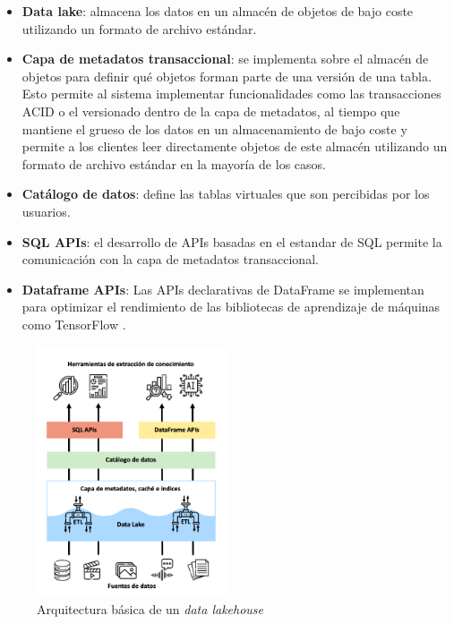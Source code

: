 \begin{itemize}
    \item \textbf{Data lake}: almacena los datos en un almacén de objetos de bajo coste utilizando un formato de archivo estándar.
    \item \textbf{Capa de metadatos transaccional}: se implementa sobre el almacén de objetos para definir qué objetos forman parte de una versión de una tabla. 
    Esto permite al sistema implementar funcionalidades como las transacciones ACID o el versionado dentro de la capa de metadatos, 
    al tiempo que mantiene el grueso de los datos en un almacenamiento de bajo coste y permite a los clientes leer directamente objetos de este almacén utilizando un formato de archivo estándar en la mayoría de los casos.
    \item \textbf{Catálogo de datos}: define las tablas virtuales que son percibidas por los usuarios.
    \item \textbf{SQL APIs}: el desarrollo de APIs basadas en el estandar de SQL permite la comunicación con la capa de metadatos transaccional.
    \item \textbf{Dataframe APIs}: Las APIs declarativas de DataFrame se implementan  
    para optimizar el rendimiento de las bibliotecas de aprendizaje de máquinas como TensorFlow \cite{tensorflow2015-whitepaper}.
\end{itemize}

\begin{figure}[h!]
    \centering
    \includegraphics[width=0.5\textwidth]{Images/dlh-architecture.png}
    \caption{Arquitectura básica de un \textit{data lakehouse}}
    \label{fig:dlh-architecture}
\end{figure}


